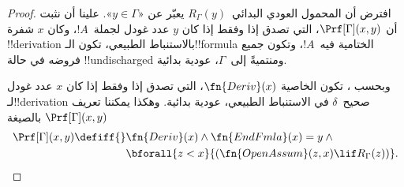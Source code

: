 \documentclass[../../../include/open-logic-section]{subfiles}
\begin{document}
\begin{proof}
  افترض أن المحمول العودي البدائي~$R_\Gamma(y)$ يعبّر عن
  «$y\in\Gamma$». علينا أن نثبت أن $\Prf[\Gamma](x,y)$، التي تصدق إذا
  وفقط إذا كان $y$ عدد غودل لجملة~$!A$، وكان $x$ شفرة !!{derivation}
  بالاستنباط الطبيعي، تكون الـ!!{formula} الختامية فيه~$!A$، وتكون جميع
  فروضه في حالة !!{undischarged} ومنتميةً إلى~$\Gamma$، عودية بدائية.

  وبحسب ، تكون الخاصية $\fn{Deriv}(x)$، التي تصدق
  إذا وفقط إذا كان $x$ عدد غودل لـ!!{derivation} صحيح~$\delta$ في
  الاستنباط الطبيعي، عودية بدائية. وهكذا يمكننا تعريف
  $\Prf[\Gamma](x,y)$ بالصيغة
  \begin{align*}
    \Prf[\Gamma](x, y) \defiff {}
    & \fn{Deriv}(x) \land \fn{EndFmla}(x) = y \land {} \\
    & \bforall{z < x}{(\fn{OpenAssum}(z, x) \lif R_\Gamma(z))}.
  \end{align*}
\end{proof}
\end{document}
